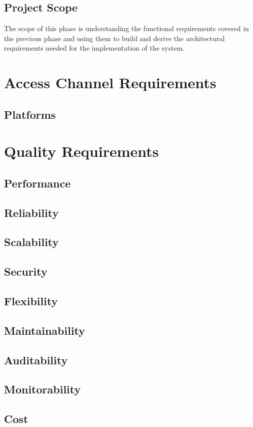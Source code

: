 \documentclass[a4paper,12pt]{report}
\begin{document}
\subsection{Project Scope}
The scope of this phase is understanding the functional requirements covered in the previous phase and using them to build and derive the architectural requirements needed for the implementation of the system.\\

\section{Access Channel Requirements}
\subsection{Platforms}

\section{Quality Requirements}
\subsection{Performance}
\subsection{Reliability}
\subsection{Scalability}
\subsection{Security}
\subsection{Flexibility}
\subsection{Maintainability}
\subsection{Auditability}
\subsection{Monitorability}
\subsection{Cost}
\end{document}
